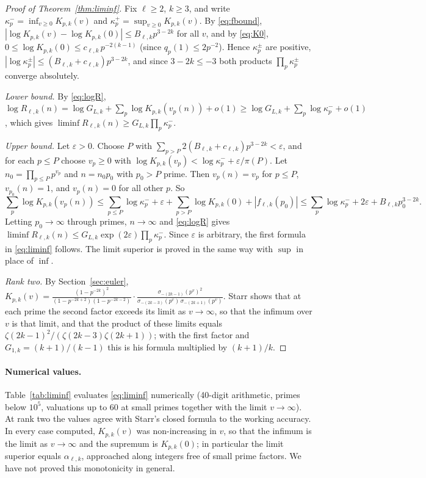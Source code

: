 \documentclass[11pt,a4paper]{article}
\theoremstyle{remark}
\numberwithin{equation}{section}
\begin{document}
\begin{proof}[Proof of Theorem~\ref{thm:liminf}]
Fix $\ell\ge2$, $k\ge3$, and write $\kappa_p^-=\inf_{v\ge0}K_{p,k}(v)$ and $\kappa_p^+=\sup_{v\ge0}K_{p,k}(v)$. By \eqref{eq:fbound}, $|\log K_{p,k}(v)-\log K_{p,k}(0)|\le B_{\ell,k}p^{3-2k}$ for all $v$, and by \eqref{eq:K0}, $0\le\log K_{p,k}(0)\le c_{\ell,k}\,p^{-2(k-1)}$ (since $q_p(1)\le2p^{-2}$). Hence $\kappa_p^\pm$ are positive, $|\log\kappa_p^\pm|\le(B_{\ell,k}+c_{\ell,k})p^{3-2k}$, and since $3-2k\le-3$ both products $\prod_p\kappa_p^\pm$ converge absolutely.

\emph{Lower bound.} By \eqref{eq:logR}, $\log R_{\ell,k}(n)=\log G_{L,k}+\sum_p\log K_{p,k}(v_p(n))+o(1)\ge\log G_{L,k}+\sum_p\log\kappa_p^-+o(1)$, which gives $\liminf R_{\ell,k}(n)\ge G_{L,k}\prod_p\kappa_p^-$.

\emph{Upper bound.} Let $\varepsilon>0$. Choose $P$ with $\sum_{p>P}2(B_{\ell,k}+c_{\ell,k})p^{3-2k}<\varepsilon$, and for each $p\le P$ choose $v_p\ge0$ with $\log K_{p,k}(v_p)<\log\kappa_p^-+\varepsilon/\pi(P)$. Let $n_0=\prod_{p\le P}p^{v_p}$ and $n=n_0p_0$ with $p_0>P$ prime. Then $v_p(n)=v_p$ for $p\le P$, $v_{p_0}(n)=1$, and $v_p(n)=0$ for all other $p$. So
\[
\sum_p\log K_{p,k}(v_p(n))\le\sum_{p\le P}\log\kappa_p^-+\varepsilon+\sum_{p>P}\log K_{p,k}(0)+|f_{\ell,k}(p_0)|
\le\sum_p\log\kappa_p^-+2\varepsilon+B_{\ell,k}p_0^{3-2k}.
\]
Letting $p_0\to\infty$ through primes, $n\to\infty$ and \eqref{eq:logR} gives $\liminf R_{\ell,k}(n)\le G_{L,k}\exp(2\varepsilon)\prod_p\kappa_p^-$. Since $\varepsilon$ is arbitrary, the first formula in \eqref{eq:liminf} follows. The limit superior is proved in the same way with $\sup$ in place of $\inf$.

\emph{Rank two.} By Section~\ref{sec:euler}, $K_{p,k}(v)=\frac{(1-p^{-2k})^2}{(1-p^{-2k+2})(1-p^{-2k-2})}\cdot\frac{\sigma_{-(2k-1)}(p^v)^2}{\sigma_{-(2k-3)}(p^v)\,\sigma_{-(2k+1)}(p^v)}$. Starr \cite[Corollary~2.4 and Appendix~B]{Starr2026a} shows that at each prime the second factor exceeds its limit as $v\to\infty$, so that the infimum over $v$ is that limit, and that the product of these limits equals $\zeta(2k-1)^2/(\zeta(2k-3)\zeta(2k+1))$; with the first factor and $G_{1,k}=(k+1)/(k-1)$ this is his formula multiplied by $(k+1)/k$.
\end{proof}

\paragraph{Numerical values.} Table~\ref{tab:liminf} evaluates \eqref{eq:liminf} numerically (40-digit arithmetic, primes below $10^5$, valuations up to $60$ at small primes together with the limit $v\to\infty$). At rank two the values agree with Starr's closed formula to the working accuracy. In every case computed, $K_{p,k}(v)$ was non-increasing in $v$, so that the infimum is the limit as $v\to\infty$ and the supremum is $K_{p,k}(0)$; in particular the limit superior equals $\alpha_{\ell,k}$, approached along integers free of small prime factors. We have not proved this monotonicity in general.
\end{document}
